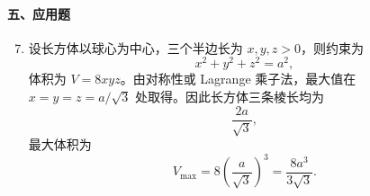 \paragraph*{五、应用题}
\begin{enumerate}
  \setcounter{enumi}{6}
  \item 设长方体以球心为中心，三个半边长为 \(x,y,z>0\)，则约束为
  \[
    x^2+y^2+z^2=a^2,
  \]
  体积为 \(V=8xyz\)。由对称性或 Lagrange 乘子法，最大值在
  \(x=y=z=a/\sqrt3\) 处取得。因此长方体三条棱长均为
  \[
    \frac{2a}{\sqrt3},
  \]
  最大体积为
  \[
    V_{\max}=8\left(\frac{a}{\sqrt3}\right)^3=\frac{8a^3}{3\sqrt3}.
  \]
\end{enumerate}
